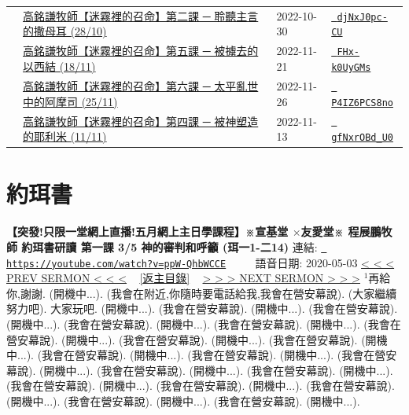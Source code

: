 \documentclass{book}
\begin{document}
{\begin{xltabular}{\textwidth}{|p{0.15\textwidth} p{0.6\textwidth}|p{0.07\textwidth} p{0.1\textwidth}|}
    & \hyperref[sec:djNxJ0pc_CU]{高銘謙牧師【迷霧裡的召命】第二課 ─ 聆聽主言的撒母耳 (28/10)} & 2022-10-30 & \href{https://youtube.com/watch?v=djNxJ0pc-CU}{\texttt{ djNxJ0pc-CU}} \\
    & \hyperref[sec:FHx_k0UyGMs]{高銘謙牧師【迷霧裡的召命】第五課 ─ 被擄去的以西結 (18/11)} & 2022-11-21 & \href{https://youtube.com/watch?v=FHx-k0UyGMs}{\texttt{ FHx-k0UyGMs}} \\
    & \hyperref[sec:P4IZ6PCS8no]{高銘謙牧師【迷霧裡的召命】第六課 ─ 太平亂世中的阿摩司 (25/11)} & 2022-11-26 & \href{https://youtube.com/watch?v=P4IZ6PCS8no}{\texttt{ P4IZ6PCS8no}} \\
    & \hyperref[sec:gfNxrOBd_U0]{高銘謙牧師【迷霧裡的召命】第四課 ─ 被神塑造的耶利米 (11/11)} & 2022-11-13 & \href{https://youtube.com/watch?v=gfNxrOBd_U0}{\texttt{ gfNxrOBd\_U0}} \\
\end{xltabular}
}
\newpage



\section{約珥書}
\label{sec:ppW_QhbWCCE}
\textbf{【突發!只限一堂網上直播!五月網上主日學課程】※宣基堂 $\times$友愛堂※ 程展鵬牧師 約珥書研讀 第一課 3/5 神的審判和呼籲 (珥一1-二14)}
\newline
\newline
連結: \href{https://youtube.com/watch?v=ppW-QhbWCCE}{\texttt{ https://youtube.com/watch?v=ppW-QhbWCCE}} ~~~~ 語音日期: 2020-05-03 
\newline
\newline
\hyperref[sec:code]{\small{< < < PREV SERMON < < <}}
~
\hyperref[sec:index]{\small{[返主目錄]}}
~
\hyperref[sec:V3TY9OLIKOY]{\small{> > > NEXT SERMON > > >}}
\newline
\newline
$^{1}$再給你,謝謝.
(開機中...).
(我會在附近,你隨時要電話給我,我會在營安幕說).
(大家繼續努力吧).
大家玩吧.
(開機中...).
(我會在營安幕說).
(開機中...).
(我會在營安幕說).
(開機中...).
(我會在營安幕說).
(開機中...).
(我會在營安幕說).
(開機中...).
(我會在營安幕說).
(開機中...).
(我會在營安幕說).
(開機中...).
(我會在營安幕說).
(開機中...).
(我會在營安幕說).
(開機中...).
(我會在營安幕說).
(開機中...).
(我會在營安幕說).
(開機中...).
(我會在營安幕說).
(開機中...).
(我會在營安幕說).
(開機中...).
(我會在營安幕說).
(開機中...).
(我會在營安幕說).
(開機中...).
(我會在營安幕說).
(開機中...).
(我會在營安幕說).
(開機中...).
(我會在營安幕說).
(開機中...).
\end{document}
